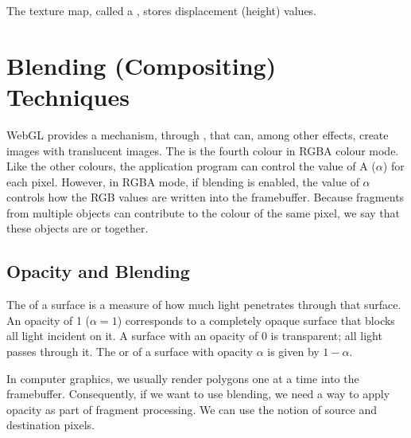 \documentclass[../COS3712_Notes.tex]{subfiles}
\begin{document}
      The texture map, called a , stores displacement (height) values.

    \section{Blending (Compositing) Techniques}
      WebGL provides a mechanism, through ,
      that can, among other effects, create images with translucent images.
      The  is the fourth colour in RGBA colour mode.
      Like the other colours, the application program can control the value of A ($\alpha$)
      for each pixel.
      However, in RGBA mode, if blending is enabled, the value of $\alpha$ controls how the
      RGB values are written into the framebuffer.
      Because fragments from multiple objects can contribute to the colour of the same pixel,
      we say that these objects are  or  together.

      \subsection{Opacity and Blending}
        The  of a surface is a measure of how much light penetrates
        through that surface.
        An opacity of 1 ($\alpha = 1$) corresponds to a completely opaque surface
        that blocks all light incident on it.
        A surface with an opacity of 0 is transparent; all light passes through it.
        The  or  of a surface with opacity $\alpha$
        is given by $1 - \alpha$.

        In computer graphics, we usually render polygons one at a time into the framebuffer.
        Consequently, if we want to use blending, we need a way to apply opacity as part of
        fragment processing.
        We can use the notion of source and destination pixels.

      \pagebreak
\end{document}
